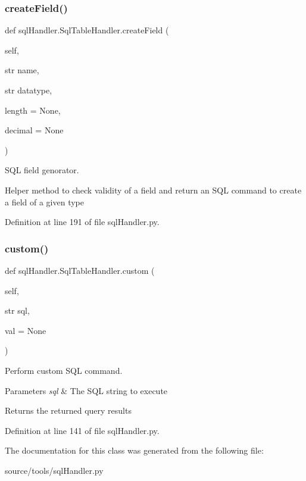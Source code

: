\subsubsection{\texorpdfstring{createField()}{createField()}}
{\footnotesize\ttfamily def sql\+Handler.\+Sql\+Table\+Handler.\+create\+Field (\begin{DoxyParamCaption}\item[{}]{self,  }\item[{str}]{name,  }\item[{str}]{datatype,  }\item[{}]{length = {\ttfamily None},  }\item[{}]{decimal = {\ttfamily None} }\end{DoxyParamCaption})}



S\+QL field genorator. 

Helper method to check validity of a field and return an S\+QL command to create a field of a given type 

Definition at line 191 of file sql\+Handler.\+py.

\mbox{\label{classsql_handler_1_1_sql_table_handler_a153cbc56e8b7a0b595566d4e28c1d482}} 
\subsubsection{\texorpdfstring{custom()}{custom()}}
{\footnotesize\ttfamily def sql\+Handler.\+Sql\+Table\+Handler.\+custom (\begin{DoxyParamCaption}\item[{}]{self,  }\item[{str}]{sql,  }\item[{}]{val = {\ttfamily None} }\end{DoxyParamCaption})}



Perform custom S\+QL command. 


\begin{DoxyParams}{Parameters}
{\em sql} & The S\+QL string to execute \\
\hline
\end{DoxyParams}
\begin{DoxyReturn}{Returns}
the returned query results 
\end{DoxyReturn}


Definition at line 141 of file sql\+Handler.\+py.



The documentation for this class was generated from the following file\+:\begin{DoxyCompactItemize}
\item 
source/tools/sql\+Handler.\+py\end{DoxyCompactItemize}
